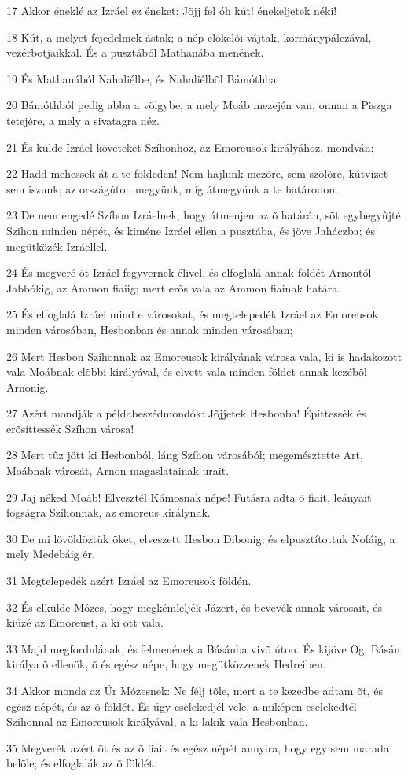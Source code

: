 \par 17 Akkor éneklé az Izráel ez éneket: Jõjj fel óh kút! énekeljetek néki!
\par 18 Kút, a melyet fejedelmek ástak; a nép elõkelõi vájtak, kormánypálczával, vezérbotjaikkal. És a pusztából Mathanába menének.
\par 19 És Mathanából Nahaliélbe, és Nahaliélbõl Bámóthba.
\par 20 Bámóthból pedig abba a völgybe, a mely Moáb mezején van, onnan a Piszga tetejére, a mely a sivatagra néz.
\par 21 És külde Izráel követeket Szíhonhoz, az Emoreusok királyához, mondván:
\par 22 Hadd mehessek át a te földeden! Nem hajlunk mezõre, sem szõlõre, kútvizet sem iszunk; az országúton megyünk, míg átmegyünk a te határodon.
\par 23 De nem engedé Szíhon Izráelnek, hogy átmenjen az õ határán, sõt egybegyûjté Szihon minden népét, és kiméne Izráel ellen a pusztába, és jöve Jaháczba; és megütközék Izráellel.
\par 24 És megveré õt Izráel fegyvernek élivel, és elfoglalá annak földét Arnontól Jabbókig, az Ammon fiaiig; mert erõs vala az Ammon fiainak határa.
\par 25 És elfoglalá Izráel mind e városokat, és megtelepedék Izráel az Emoreusok minden városában, Hesbonban és annak minden városában;
\par 26 Mert Hesbon Szíhonnak az Emoreusok királyának városa vala, ki is hadakozott vala Moábnak elõbbi királyával, és elvett vala minden földet annak kezébõl Arnonig.
\par 27 Azért mondják a példabeszédmondók: Jõjjetek Hesbonba! Építtessék és erõsíttessék Szíhon városa!
\par 28 Mert tûz jött ki Hesbonból, láng Szíhon városából; megemésztette Art, Moábnak városát, Arnon magaslatainak urait.
\par 29 Jaj néked Moáb! Elvesztél Kámosnak népe! Futásra adta õ fiait, leányait fogságra Szíhonnak, az emoreus királynak.
\par 30 De mi lövöldöztük õket, elveszett Hesbon Dibonig, és elpusztítottuk Nofáig, a mely Medebáig ér.
\par 31 Megtelepedék azért Izráel az Emoreusok földén.
\par 32 És elkülde Mózes, hogy megkémleljék Jázert, és bevevék annak városait, és kiûzé az Emoreust, a ki ott vala.
\par 33 Majd megfordulának, és felmenének a Básánba vivõ úton. És kijöve Og, Básán királya õ ellenök, õ és egész népe, hogy megütközzenek Hedreiben.
\par 34 Akkor monda az Úr Mózesnek: Ne félj tõle, mert a te kezedbe adtam õt, és egész népét, és az õ földét. És úgy cselekedjél vele, a miképen cselekedtél Szíhonnal az Emoreusok királyával, a ki lakik vala Hesbonban.
\par 35 Megverék azért õt és az õ fiait és egész népét annyira, hogy egy sem marada belõle; és elfoglalák az õ földét.

